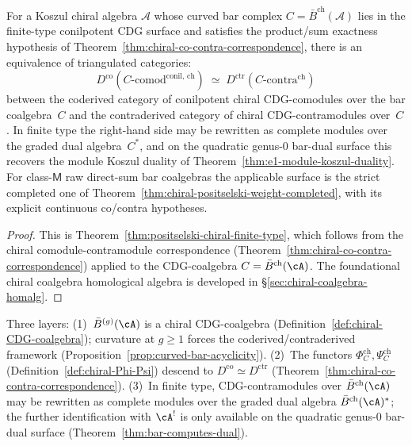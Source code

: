 \begin{theorem}
\label{thm:positselski-chiral}
For a Koszul chiral algebra $\mathcal{A}$ whose curved bar complex
$C=\bar{B}^{\mathrm{ch}}(\mathcal{A})$ lies in the finite-type
conilpotent CDG surface and satisfies the product/sum exactness
hypothesis of
Theorem~\textup{\ref{thm:chiral-co-contra-correspondence}}, there is
an equivalence of
triangulated categories:
\begin{equation}\label{eq:positselski-equivalence}
D^{\mathrm{co}}(C\text{-}\mathrm{comod}^{\mathrm{conil,\,ch}})
\;\simeq\;
D^{\mathrm{ctr}}(C\text{-}\mathrm{contra}^{\mathrm{ch}})
\end{equation}
between the coderived category of conilpotent chiral
CDG-comodules over the bar coalgebra~$C$ and the contraderived
category of chiral CDG-contramodules over~$C$. In finite type the
right-hand side may be rewritten as complete modules over the graded
dual algebra~$C^*$, and on the quadratic genus-$0$ bar-dual surface
this recovers the module Koszul duality of
Theorem~\textup{\ref{thm:e1-module-koszul-duality}}.
For class-$\mathsf M$ raw direct-sum bar coalgebras the applicable
surface is the strict completed one of
Theorem~\textup{\ref{thm:chiral-positselski-weight-completed}}, with
its explicit continuous co/contra hypotheses.
\end{theorem}

\begin{proof}
This is Theorem~\ref{thm:positselski-chiral-finite-type}, which follows
from the chiral comodule-contramodule correspondence
(Theorem~\ref{thm:chiral-co-contra-correspondence}) applied to the
CDG-coalgebra $C = \bar{B}^{\mathrm{ch}}(\cA)$. The foundational
chiral coalgebra homological algebra is developed in
\S\ref{sec:chiral-coalgebra-homalg}.
\end{proof}

\begin{remark}
\label{rem:positselski-proof-strategy}
Three layers: (1)~$\bar{B}^{(g)}(\cA)$ is a chiral CDG-coalgebra
\textup{(}Definition~\ref{def:chiral-CDG-coalgebra}\textup{)};
curvature at $g \geq 1$ forces the coderived/contraderived framework
\textup{(}Proposition~\ref{prop:curved-bar-acyclicity}\textup{)}.
(2)~The functors $\Phi_C^{\mathrm{ch}}, \Psi_C^{\mathrm{ch}}$
\textup{(}Definition~\ref{def:chiral-Phi-Psi}\textup{)} descend to
$D^{\mathrm{co}} \simeq D^{\mathrm{ctr}}$
\textup{(}Theorem~\ref{thm:chiral-co-contra-correspondence}\textup{)}.
(3)~In finite type, CDG-contramodules over
$\bar{B}^{\mathrm{ch}}(\cA)$ may be rewritten as complete modules over
the graded dual algebra $\bar{B}^{\mathrm{ch}}(\cA)^*$; the further
identification with $\cA^!$ is only available on the quadratic
genus-$0$ bar-dual surface
\textup{(}Theorem~\ref{thm:bar-computes-dual}\textup{)}.
\end{remark}

